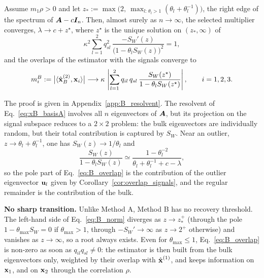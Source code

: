 \begin{prop}[Method B]\label{prop:B_overlaps}
Assume $m_1\rho > 0$ and let
$z_* := \max\!\big(2,\ \max_{l:\,\theta_l > 1}(\theta_l + \theta_l^{-1})\big)$, the right edge of the spectrum of $\bm{A} - c\bm{I}_n$.
Then, almost surely as $n\to\infty$, the selected multiplier converges, $\lambda \to c + z^\star$,
where $z^\star$ is the unique solution on $(z_*,\infty)$ of
\begin{equation}
    \kappa^2 \sum_{l=1}^{2} q_{sl}^2\,
    \frac{-S_W'(z)}{\big(1-\theta_l S_W(z)\big)^2} = 1 ,
    \label{eq:B_norm}
\end{equation}
and the overlaps of the estimator with the signals converge to
\begin{equation}
    m^B_i := \big|\langle \hat{\boldsymbol{\mathbf{x}}}^{(2)}_B, \boldsymbol{\mathbf{x}}_i\rangle\big|
    \longrightarrow
    \kappa\, \left| \sum_{l=1}^{2} q_{il}\, q_{sl}\,
    \frac{S_W(z^\star)}{1-\theta_l S_W(z^\star)} \right| ,
    \qquad i = 1,2,3 .
    \label{eq:B_overlap}
\end{equation}
\end{prop}
\noindent
The proof is given in Appendix~\ref{app:B_resolvent}. The resolvent of Eq.~\eqref{eq:xB_basisA} involves all $n$ eigenvectors of $\bm{A}$, but its projection on the signal subspace reduces to a $2\times 2$ problem: the bulk eigenvectors are individually random, but their total contribution is captured by $S_W$. Near an outlier, $z \to \theta_l + \theta_l^{-1}$, one has $S_W(z) \to 1/\theta_l$ and
\[
    \frac{S_W(z)}{1-\theta_l S_W(z)} \simeq \frac{1-\theta_l^{-2}}{\theta_l + \theta_l^{-1} + c - \lambda} ,
\]
so the pole part of Eq.~\eqref{eq:B_overlap} is the contribution of the outlier eigenvector $\boldsymbol{\mathbf{u}}_l$ given by Corollary~\ref{cor:overlap_signals}, and the regular remainder is the contribution of the bulk.

\noindent
\textbf{No sharp transition.} Unlike Method A, Method B has no recovery threshold. The left-hand side of Eq.~\eqref{eq:B_norm} diverges as $z \to z_*^+$ (through the pole $1-\theta_{\max}S_W = 0$ if $\theta_{\max} > 1$, through $-S_W' \to \infty$ as $z\to 2^+$ otherwise) and vanishes as $z\to\infty$, so a root always exists. Even for $\theta_{\max} \le 1$, Eq.~\eqref{eq:B_overlap} is non-zero as soon as $q_{il} q_{sl} \neq 0$: the estimator is then built from the bulk eigenvectors only, weighted by their overlap with $\hat{\boldsymbol{\mathbf{x}}}^{(1)}$, and keeps information on $\boldsymbol{\mathbf{x}}_1$, and on $\boldsymbol{\mathbf{x}}_2$ through the correlation $\rho$.
